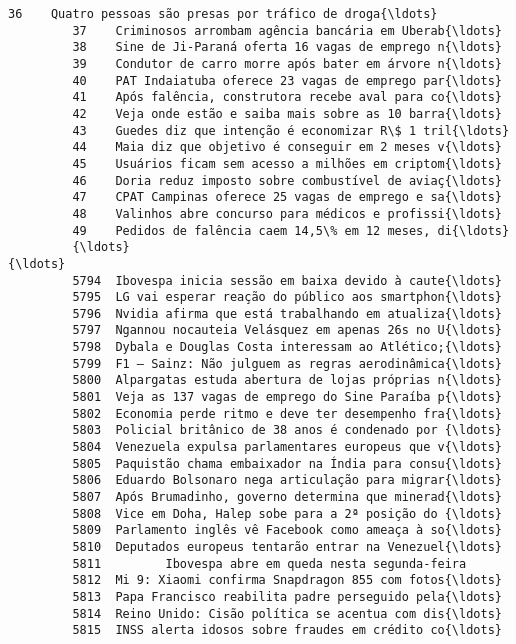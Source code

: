 \documentclass[11pt]{article}
\begin{document}
\begin{Verbatim}[commandchars=\\\{\}]
         36    Quatro pessoas são presas por tráfico de droga{\ldots}  
         37    Criminosos arrombam agência bancária em Uberab{\ldots}  
         38    Sine de Ji-Paraná oferta 16 vagas de emprego n{\ldots}  
         39    Condutor de carro morre após bater em árvore n{\ldots}  
         40    PAT Indaiatuba oferece 23 vagas de emprego par{\ldots}  
         41    Após falência, construtora recebe aval para co{\ldots}  
         42    Veja onde estão e saiba mais sobre as 10 barra{\ldots}  
         43    Guedes diz que intenção é economizar R\$ 1 tril{\ldots}  
         44    Maia diz que objetivo é conseguir em 2 meses v{\ldots}  
         45    Usuários ficam sem acesso a milhões em criptom{\ldots}  
         46    Doria reduz imposto sobre combustível de aviaç{\ldots}  
         47    CPAT Campinas oferece 25 vagas de emprego e sa{\ldots}  
         48    Valinhos abre concurso para médicos e profissi{\ldots}  
         49    Pedidos de falência caem 14,5\% em 12 meses, di{\ldots}  
         {\ldots}                                                 {\ldots}  
         5794  Ibovespa inicia sessão em baixa devido à caute{\ldots}  
         5795  LG vai esperar reação do público aos smartphon{\ldots}  
         5796  Nvidia afirma que está trabalhando em atualiza{\ldots}  
         5797  Ngannou nocauteia Velásquez em apenas 26s no U{\ldots}  
         5798  Dybala e Douglas Costa interessam ao Atlético;{\ldots}  
         5799  F1 – Sainz: Não julguem as regras aerodinâmica{\ldots}  
         5800  Alpargatas estuda abertura de lojas próprias n{\ldots}  
         5801  Veja as 137 vagas de emprego do Sine Paraíba p{\ldots}  
         5802  Economia perde ritmo e deve ter desempenho fra{\ldots}  
         5803  Policial britânico de 38 anos é condenado por {\ldots}  
         5804  Venezuela expulsa parlamentares europeus que v{\ldots}  
         5805  Paquistão chama embaixador na Índia para consu{\ldots}  
         5806  Eduardo Bolsonaro nega articulação para migrar{\ldots}  
         5807  Após Brumadinho, governo determina que minerad{\ldots}  
         5808  Vice em Doha, Halep sobe para a 2ª posição do {\ldots}  
         5809  Parlamento inglês vê Facebook como ameaça à so{\ldots}  
         5810  Deputados europeus tentarão entrar na Venezuel{\ldots}  
         5811         Ibovespa abre em queda nesta segunda-feira  
         5812  Mi 9: Xiaomi confirma Snapdragon 855 com fotos{\ldots}  
         5813  Papa Francisco reabilita padre perseguido pela{\ldots}  
         5814  Reino Unido: Cisão política se acentua com dis{\ldots}  
         5815  INSS alerta idosos sobre fraudes em crédito co{\ldots}  

\end{Verbatim}
\end{document}
